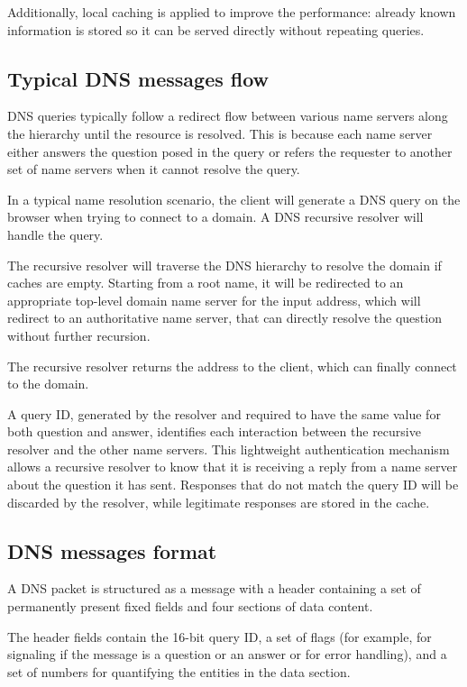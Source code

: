 \documentclass[11pt,a4paper]{article}
\begin{document}
\noindent
Additionally, local caching is applied to improve the performance: already known information is stored so it can be served directly without repeating queries.

\subsection{Typical DNS messages flow}
DNS queries typically follow a redirect flow between various name servers along the hierarchy
until the resource is resolved. This is because each name server either answers the question
posed in the query or refers the requester to another set of name servers when it cannot
resolve the query.

\hfill \break
\noindent
In a typical name resolution scenario, the client will generate a DNS query on the browser
when trying to connect to a domain. A DNS recursive resolver will handle the query.

\noindent
The recursive resolver will traverse the DNS hierarchy to resolve
the domain if caches are empty. Starting from a root name, it will be redirected to an appropriate top-level domain
name server for the input address, which will redirect to an authoritative name server, that can directly resolve the question without further recursion.

\noindent
The recursive resolver returns the address to the client, which can finally connect to the
domain.

\hfill \break
\noindent
A query ID, generated by the resolver and required to have the same value for both question and answer, identifies each interaction between the recursive resolver and the other name servers. This lightweight authentication mechanism allows a
recursive resolver to know that it is receiving a reply from a name server about the
question it has sent. Responses that do not match the query ID will be discarded by the resolver,
while legitimate responses are stored in the cache.

\subsection{DNS messages format}

A DNS packet is structured as a message with a header containing a set of permanently present fixed
fields and four sections of data content.

\noindent
The header fields contain the 16-bit query ID, a set of flags (for example, for signaling if the message is a question or an answer or for error handling), and a set of numbers for quantifying
the entities in the data section.
\end{document}
